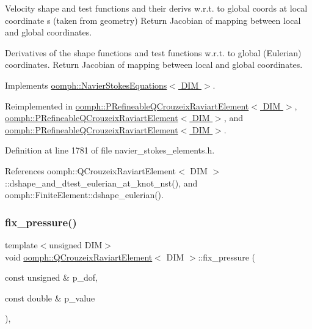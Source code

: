 Velocity shape and test functions and their derivs w.\+r.\+t. to global coords at local coordinate s (taken from geometry) Return Jacobian of mapping between local and global coordinates. 

Derivatives of the shape functions and test functions w.\+r.\+t. to global (Eulerian) coordinates. Return Jacobian of mapping between local and global coordinates. 

Implements \hyperlink{classoomph_1_1NavierStokesEquations_aeea4a1a3035ef93deaa68cc869e67dd8}{oomph\+::\+Navier\+Stokes\+Equations$<$ D\+I\+M $>$}.



Reimplemented in \hyperlink{classoomph_1_1PRefineableQCrouzeixRaviartElement_adb1580b8713df0efdda70ddf47afda20}{oomph\+::\+P\+Refineable\+Q\+Crouzeix\+Raviart\+Element$<$ D\+I\+M $>$}, \hyperlink{classoomph_1_1PRefineableQCrouzeixRaviartElement_a8ded9a5c48d5112468313b1354ad5b44}{oomph\+::\+P\+Refineable\+Q\+Crouzeix\+Raviart\+Element$<$ D\+I\+M $>$}, and \hyperlink{classoomph_1_1PRefineableQCrouzeixRaviartElement_a72a81749bb4c7f43462324935e1617a7}{oomph\+::\+P\+Refineable\+Q\+Crouzeix\+Raviart\+Element$<$ D\+I\+M $>$}.



Definition at line 1781 of file navier\+\_\+stokes\+\_\+elements.\+h.



References oomph\+::\+Q\+Crouzeix\+Raviart\+Element$<$ D\+I\+M $>$\+::dshape\+\_\+and\+\_\+dtest\+\_\+eulerian\+\_\+at\+\_\+knot\+\_\+nst(), and oomph\+::\+Finite\+Element\+::dshape\+\_\+eulerian().

\mbox{\label{classoomph_1_1QCrouzeixRaviartElement_ae885b689682846f17db8d2e07f711838}} 
\subsubsection{\texorpdfstring{fix\+\_\+pressure()}{fix\_pressure()}}
{\footnotesize\ttfamily template$<$unsigned D\+IM$>$ \\
void \hyperlink{classoomph_1_1QCrouzeixRaviartElement}{oomph\+::\+Q\+Crouzeix\+Raviart\+Element}$<$ D\+IM $>$\+::fix\+\_\+pressure (\begin{DoxyParamCaption}\item[{const unsigned \&}]{p\+\_\+dof,  }\item[{const double \&}]{p\+\_\+value }\end{DoxyParamCaption})\hspace{0.3cm}{\ttfamily [inline]}, {\ttfamily [virtual]}}



